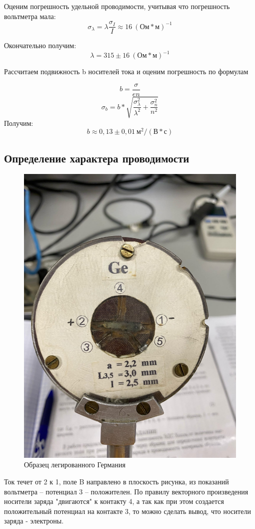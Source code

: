 \documentclass[a4paper,12pt]{article}
\begin{document}
Оценим погрешность удельной проводимости, учитывая что погрешность вольтметра мала:
$$
	\sigma_{\lambda} = \lambda \frac{\sigma_I}{I} \approx 16 \ (Ом*м)^{-1}
$$

Окончательно получим:
$$
	\lambda = 315 \pm 16 \ (Ом*м)^{-1}
$$

Рассчитаем подвижность b носителей тока и оценим погрешность по формулам

$$
	b = \frac{\sigma}{en} 
$$
$$
	\sigma_b = b * \sqrt{ \frac{\sigma_{\lambda}^2}{\lambda^2} + \frac{\sigma_{n}^2}{n^2}  }
$$
Получим:
$$
	b \approx 0,13 \pm 0,01 \ м^2/(В*с)
$$

\newpage

\subsection*{Определение характера проводимости}
\begin{figure}[h]
		\begin{center}
		\includegraphics[scale=0.14]{fig2}
		\end{center}
		\caption{Образец легированного Германия}
		\end{figure}
Ток течет от 2 к 1, поле B направлено в плоскость рисунка, из показаний вольтметра -- потенциал 3 -- положителен. По правилу векторного произведения носители заряда "двигаются" к контакту 4, а так как при этом создается положительный потенциал на контакте 3, то можно сделать вывод, что носители заряда - электроны.
\end{document}
